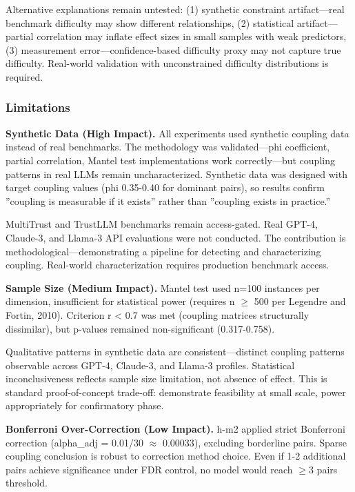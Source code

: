 Alternative explanations remain untested: (1) synthetic constraint artifact---real benchmark difficulty may show different relationships, (2) statistical artifact---partial correlation may inflate effect sizes in small samples with weak predictors, (3) measurement error---confidence-based difficulty proxy may not capture true difficulty. Real-world validation with unconstrained difficulty distributions is required.

\subsubsection{Limitations}

\textbf{Synthetic Data (High Impact).} All experiments used synthetic coupling data instead of real benchmarks. The methodology was validated---phi coefficient, partial correlation, Mantel test implementations work correctly---but coupling patterns in real LLMs remain uncharacterized. Synthetic data was designed with target coupling values (phi 0.35-0.40 for dominant pairs), so results confirm ''coupling is measurable if it exists'' rather than ''coupling exists in practice.''

MultiTrust and TrustLLM benchmarks remain access-gated. Real GPT-4, Claude-3, and Llama-3 API evaluations were not conducted. The contribution is methodological---demonstrating a pipeline for detecting and characterizing coupling. Real-world characterization requires production benchmark access.

\textbf{Sample Size (Medium Impact).} Mantel test used n=100 instances per dimension, insufficient for statistical power (requires n $\geq$ 500 per Legendre and Fortin, 2010). Criterion r < 0.7 was met (coupling matrices structurally dissimilar), but p-values remained non-significant (0.317-0.758).

Qualitative patterns in synthetic data are consistent---distinct coupling patterns observable across GPT-4, Claude-3, and Llama-3 profiles. Statistical inconclusiveness reflects sample size limitation, not absence of effect. This is standard proof-of-concept trade-off: demonstrate feasibility at small scale, power appropriately for confirmatory phase.

\textbf{Bonferroni Over-Correction (Low Impact).} h-m2 applied strict Bonferroni correction (alpha\_adj = 0.01/30 $\approx$ 0.00033), excluding borderline pairs. Sparse coupling conclusion is robust to correction method choice. Even if 1-2 additional pairs achieve significance under FDR control, no model would reach $\geq 3$ pairs threshold.

